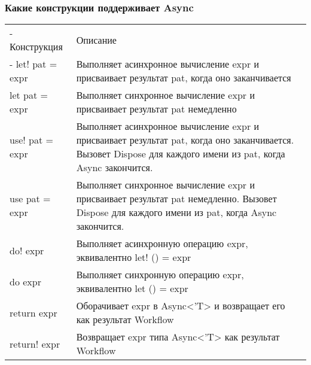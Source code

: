 \documentclass[xetex,mathserif,serif]{beamer}
\begin{document}
	\begin{frame}
		\frametitle{Какие конструкции поддерживает Async}
		\begin{footnotesize}
			\begin{tabu} {| X[0.3 l p] | X[1 l p] |}
				\tabucline-
				Конструкция               & Описание           \\
				\tabucline-
				\everyrow{\tabucline-}
				let! pat = expr           & Выполняет асинхронное вычисление expr и присваивает результат pat, когда оно заканчивается   \\
				let pat = expr            & Выполняет синхронное вычисление expr и присваивает результат pat немедленно \\
				use! pat = expr           & Выполняет асинхронное вычисление expr и присваивает результат pat, когда оно заканчивается. Вызовет Dispose для каждого имени из pat, когда Async закончится.    \\
				use pat = expr            & Выполняет синхронное вычисление expr и присваивает результат pat немедленно. Вызовет Dispose для каждого имени из pat, когда Async закончится. \\
				do! expr                  & Выполняет асинхронную операцию expr, эквивалентно let! () = expr \\
				do expr                   & Выполняет синхронную операцию expr, эквивалентно let () = expr \\
				return expr               & Оборачивает expr в Async<'T> и возвращает его как результат Workflow \\
				return! expr              & Возвращает expr типа Async<'T> как результат Workflow \\
			\end{tabu}
		\end{footnotesize}
	\end{frame}
\end{document}
